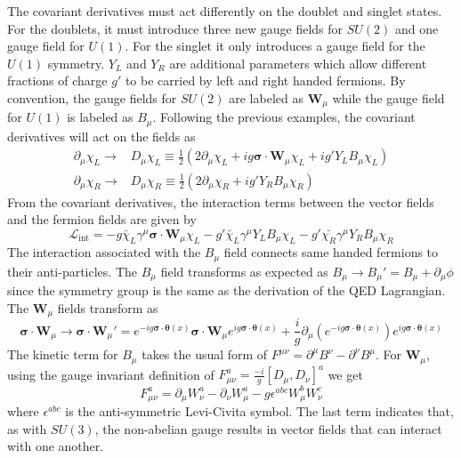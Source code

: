 The covariant derivatives must act differently on the doublet and singlet states. For the doublets, it must introduce three new gauge fields for $SU(2)$ and one gauge field for $U(1)$. For the singlet it only introduces a gauge field for the $U(1)$ symmetry. $Y_L$ and $Y_R$ are additional parameters which allow different fractions of charge $g'$ to be carried by left and right handed fermions. By convention, the gauge fields for $SU(2)$ are labeled as $\mathbf{W}_\mu$ while the gauge field for $U(1)$ is labeled as $B_\mu$. Following the previous examples, the covariant derivatives will act on the fields as
\begin{align}
	\label{eq:ew_cov_derivative}
	\partial_\mu\chi_L\to&D_\mu\chi_L\equiv\frac{1}{2}\left(2\partial_\mu\chi_L+ig\boldsymbol{\sigma}\cdot\mathbf{W}_\mu\chi_L+ig'Y_{L}B_\mu\chi_L\right)\\
	\partial_\mu\chi_R\to&D_\mu\chi_R\equiv\frac{1}{2}\left(2\partial_\mu\chi_R+ig'Y_{R}B_\mu\chi_R\right)
\end{align}
From the covariant derivatives, the interaction terms between the vector fields and the fermion fields are given by
\begin{equation}
	\label{eq:ew_interaction}
	\mathcal{L}_\text{int}=-g\bar{\chi}_L\gamma^\mu\boldsymbol{\sigma}\cdot\mathbf{W}_\mu\chi_L-g'\bar{\chi}_L\gamma^\mu Y_{L}B_\mu\chi_L-g'\bar{\chi_R}\gamma^\mu Y_{R} B_\mu\chi_R
\end{equation}
The interaction associated with the $B_\mu$ field connects same handed fermions to their anti-particles. The $B_\mu$ field transforms as expected as $B_\mu\to B_\mu'=B_\mu+\partial_\mu\phi$ since the symmetry group is the same as the derivation of the QED Lagrangian. The $\mathbf{W}_\mu$ fields transform as
\begin{equation}
	\boldsymbol{\sigma}\cdot\mathbf{W}_\mu\to\boldsymbol{\sigma}\cdot\mathbf{W}_\mu'=e^{-ig\boldsymbol{\sigma}\cdot\boldsymbol{\theta}(x)}\boldsymbol{\sigma}\cdot\mathbf{W}_\mu e^{ig\boldsymbol{\sigma}\cdot\boldsymbol{\theta}(x)}+\frac{i}{g}\partial_\mu\left(e^{-ig\boldsymbol{\sigma}\cdot\boldsymbol{\theta}(x)}\right)e^{ig\boldsymbol{\sigma}\cdot\boldsymbol{\theta}(x)}
\end{equation}
The kinetic term for $B_\mu$ takes the usual form of $F^{\mu\nu}=\partial^\mu B^\nu-\partial^\nu B^\mu$. For $\mathbf{W}_\mu$, using the gauge invariant definition of $F^{a}_{\mu\nu}=\frac{-i}{g}[D_\mu,D_\nu]^a$ we get
\begin{equation}
	F^{a}_{\mu\nu}=\partial_\mu W_\nu^a-\partial_\nu W_\mu^a-g\epsilon^{abc}W_\mu^bW_\nu^c
\end{equation}
where $\epsilon^{abc}$ is the anti-symmetric Levi-Civita symbol. The last term indicates that, as with $SU(3)$, the non-abelian gauge results in vector fields that can interact with one another.

